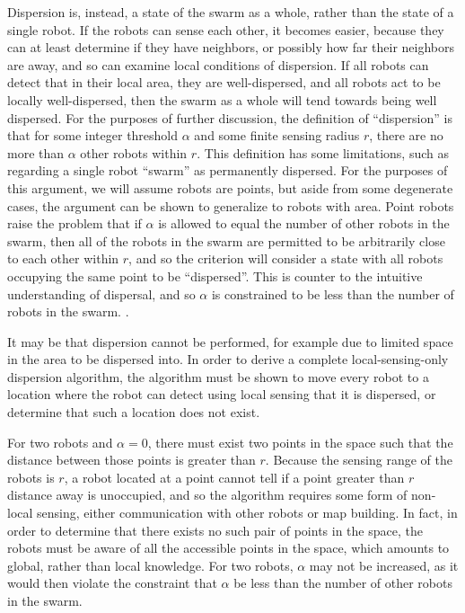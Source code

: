 Dispersion is, instead, a state of the swarm as a whole, rather than the state of a single robot. 
If the robots can sense each other, it becomes easier, because they can at least determine if they have neighbors, or possibly how far their neighbors are away, and so can examine local conditions of dispersion. If all robots can detect that in their local area, they are well-dispersed, and all robots act to be locally well-dispersed, then the swarm as a whole will tend towards being well dispersed. 
For the purposes of further discussion, the definition of ``dispersion'' is that for some integer threshold $\alpha$ and some finite sensing radius $r$, there are no more than $\alpha$ other robots within $r$. 
This definition has some limitations, such as regarding a single robot ``swarm'' as permanently dispersed. 
For the purposes of this argument, we will assume robots are points, but aside from some degenerate cases, the argument can be shown to generalize to robots with area. 
Point robots raise the problem that if $\alpha$ is allowed to equal the number of other robots in the swarm, then all of the robots in the swarm are permitted to be arbitrarily close to each other within $r$, and so the criterion will consider a state with all robots occupying the same point to be ``dispersed''. 
This is counter to the intuitive understanding of dispersal, and so $\alpha$ is constrained to be less than the number of robots in the swarm. 
.

It may be that dispersion cannot be performed, for example due to limited space in the area to be dispersed into. 
In order to derive a complete local-sensing-only dispersion algorithm, the algorithm must be shown to move every robot to a location where the robot can detect using local sensing that it is dispersed, or determine that such a location does not exist.

For two robots and $\alpha = 0$, there must exist two points in the space such that the distance between those points is greater than $r$. 
Because the sensing range of the robots is $r$, a robot located at a point cannot tell if a point greater than $r$ distance away is unoccupied, and so the algorithm requires some form of non-local sensing, either communication with other robots or map building. 
In fact, in order to determine that there exists no such pair of points in the space, the robots must be aware of all the accessible points in the space, which amounts to global, rather than local knowledge. 
For two robots, $\alpha$ may not be increased, as it would then violate the constraint that $\alpha$ be less than the number of other robots in the swarm. 

